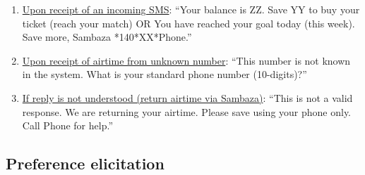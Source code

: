 \documentclass[11pt]{article}
\begin{document}
            \begin{enumerate}
                \item \underline{Upon receipt of an incoming SMS}: ``Your balance is ZZ.  Save YY to buy your ticket (reach your match) OR You have reached your goal today (this week).  Save more, Sambaza *140*XX*Phone.''
                \item \underline{Upon receipt of airtime from unknown number}: ``This number is not known in the system.  What is your standard phone number (10-digits)?''
                \item \underline{If reply is not understood (return airtime via Sambaza)}: ``This is not a valid response.  We are returning your airtime.  Please save using your phone only.  Call Phone for help.''
            \end{enumerate}

    \subsection{Preference elicitation}

	\clearpage
\end{document}
